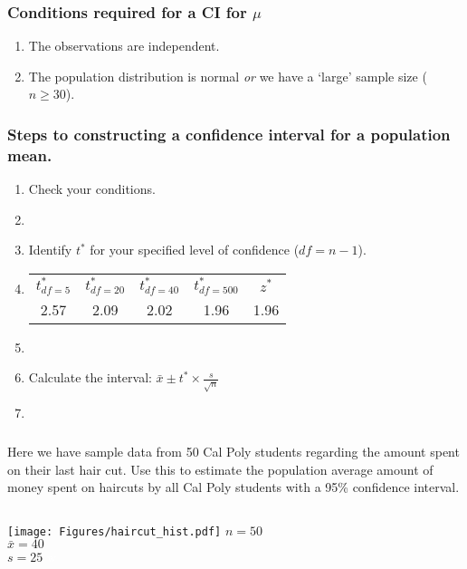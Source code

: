 \begin{frame}
\frametitle{Conditions required for a CI for $\mu$}
\begin{enumerate}
       \item
        The observations are independent.
        \item
        The population distribution is normal \emph{or} we have a `large' sample size ($n\geq 30$).
    \end{enumerate}
\end{frame}



\begin{frame}[label=stepsci]
\frametitle{Steps to constructing a confidence interval for a population mean.}
\begin{enumerate}
    \item
    Check your conditions.
    \item[]
    \item
    Identify $t^{*}$ for your specified level of confidence ($df=n-1$).
    \item[]
    \begin{tabular}{|ccccc|}
\hline
$t^*_{df=5}$ & $t^*_{df=20}$ & $t^*_{df=40}$ & $t^*_{df=500}$ & $z^*$ \\
2.57 & 2.09 & 2.02 & 1.96 & 1.96 \\
\hline
\end{tabular}
\item[] 
    \item
    Calculate the interval: $\displaystyle \bar{x} \pm t^{*} \times \frac{s}{\sqrt{n}}$
    \item[]
\end{enumerate}
\end{frame}

\begin{frame}
\frametitle{\grp}
\begin{clicker}{Here we have sample data from 50 Cal Poly students regarding the amount spent on their last hair cut.  Use this to estimate the population average amount of money spent on haircuts by all Cal Poly students with a 95\% confidence interval.}
\end{clicker}
\begin{columns}
\texttt{[image: Figures/haircut\_hist.pdf]}
\vskip15pt
$n=50$\\
$\bar{x}=40 $\\
$s=25$
\textcolor{white}{w}
\end{columns}
\end{frame}

